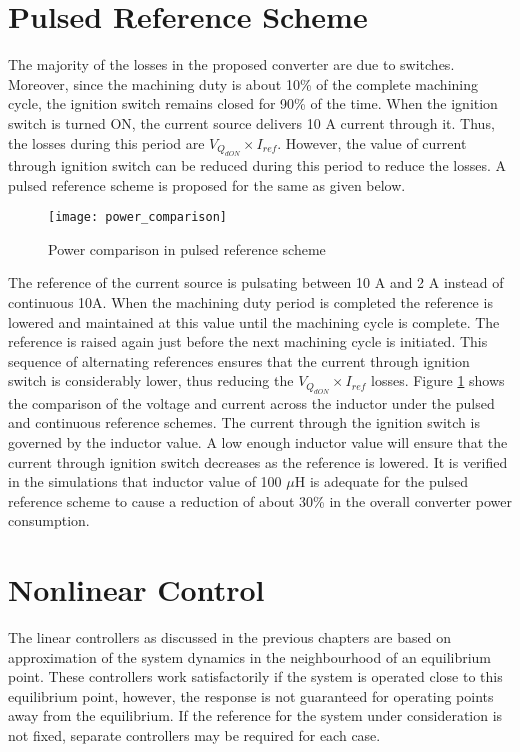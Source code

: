 	\section{Pulsed Reference Scheme}
	The majority of the losses in the proposed converter are due to switches. Moreover, since the machining duty is about 10\% of the complete machining cycle, the ignition switch remains closed for 90\% of the time. When the ignition switch is turned ON, the current source delivers 10 A current through it. Thus, the losses during this period are $V_{Q_{d ON}}\times I_{ref}$. However, the value of current through ignition switch can be reduced during this period to reduce the losses. A pulsed reference scheme is proposed for the same as given below.
	\begin{figure}[h]
		\centering
		\texttt{[image: power\_comparison]}
		\caption{Power comparison in pulsed reference scheme}
		\label{fig:pulsed-reference}
	\end{figure}
	The reference of the current source is pulsating between 10 A and 2 A instead of continuous 10A. When the machining duty period is completed the reference is lowered and maintained at this value until the machining cycle is complete. The reference is raised again just before the next machining cycle is initiated. This sequence of alternating references ensures that the current through ignition switch is considerably lower, thus reducing the $V_{Q_{d ON}}\times I_{ref}$ losses. Figure \ref{fig:pulsed-reference} shows the comparison of the voltage and current across the inductor under the pulsed and continuous reference schemes. The current through the ignition switch is governed by the inductor value. A low enough inductor value will ensure that the current through ignition switch decreases as the reference is lowered. It is verified in the simulations that inductor value of 100 $\mu$H is adequate for the pulsed reference scheme to cause a reduction of about 30\% in the overall converter power consumption.
	
	
	\section{Nonlinear Control}
	The linear controllers as discussed in the previous chapters are based on approximation of the system dynamics in the neighbourhood of an equilibrium point. These controllers work satisfactorily if the system is operated close to this equilibrium point, however,  the response is not guaranteed for operating points away from the equilibrium. If the reference for the system under consideration is not fixed, separate controllers may be required for each case. 
    
